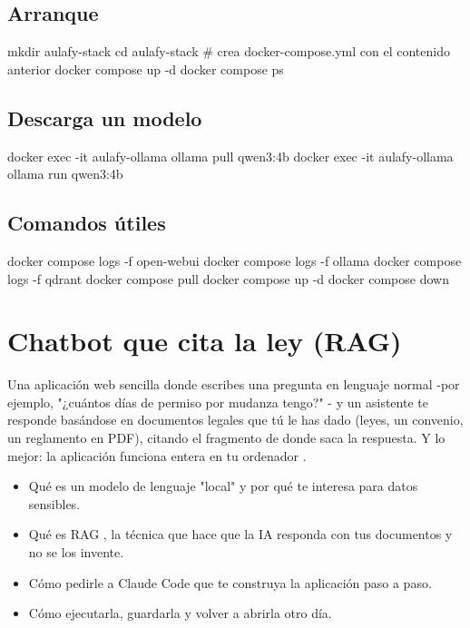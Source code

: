 \documentclass[11pt,a4paper]{book}
\begin{document}
\section{Arranque}
\begin{codebox}
mkdir aulafy-stack
cd aulafy-stack
# crea docker-compose.yml con el contenido anterior
docker compose up -d
docker compose ps
\end{codebox}
\section{Descarga un modelo}
\begin{codebox}
docker exec -it aulafy-ollama ollama pull qwen3:4b
docker exec -it aulafy-ollama ollama run qwen3:4b
\end{codebox}
\section{Comandos útiles}
\begin{codebox}
docker compose logs -f open-webui
docker compose logs -f ollama
docker compose logs -f qdrant
docker compose pull
docker compose up -d
docker compose down
\end{codebox}
\chapter{Chatbot que cita la ley (RAG)}
Una aplicación web sencilla donde escribes una pregunta en lenguaje normal -por ejemplo, "¿cuántos días de permiso por mudanza tengo?" - y un asistente te responde basándose en documentos legales que tú le has dado (leyes, un convenio, un reglamento en PDF), citando el fragmento de donde saca la respuesta. Y lo mejor: la aplicación funciona entera en tu ordenador .

\begin{itemize}\item Qué es un modelo de lenguaje "local" y por qué te interesa para datos sensibles.\end{itemize}
\begin{itemize}\item Qué es RAG , la técnica que hace que la IA responda con tus documentos y no se los invente.\end{itemize}
\begin{itemize}\item Cómo pedirle a Claude Code que te construya la aplicación paso a paso.\end{itemize}
\begin{itemize}\item Cómo ejecutarla, guardarla y volver a abrirla otro día.\end{itemize}
\end{document}

